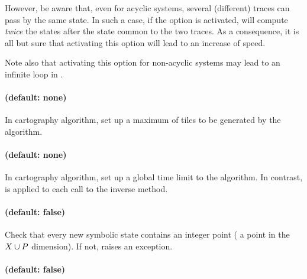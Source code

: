 However, be aware that, even for acyclic systems, several (different) traces can pass by the same state.
In such a case, if the  option is activated, \imitator{} will compute \emph{twice} the states after the state common to the two traces.
As a consequence, it is all but sure that activating this option will lead to an increase of speed.

Note also that activating this option for non-acyclic systems may lead to an infinite loop in \imitator{}.


\paragraph{ (default: none)}

In cartography algorithm, set up a maximum of tiles to be generated by the algorithm.


\paragraph{ (default: none)}

In cartography algorithm, set up a global time limit to the algorithm.
In contrast,  is applied to each call to the inverse method.


\paragraph{ (default: false)}

Check that every new symbolic state contains an integer point (\ie{} a point in the $X \cup P$ dimension).
If not, raises an exception.


\paragraph{ (default: false)}

